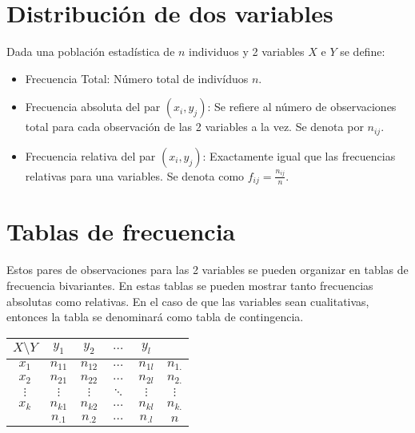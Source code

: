 \documentclass[10pt,a4paper]{book}
\begin{document}
\section{Distribución de dos variables}
Dada una población estadística de $n$ individuos y 2 variables $X$ e $Y$ se define:
\begin{itemize}
	\item Frecuencia Total: Número total de indivíduos $n$.
	\item Frecuencia absoluta del par $(x_i, y_j)$: Se refiere al número de observaciones total para cada observación de las 2 variables a la vez. Se denota por $n_{ij}$.
	\item Frecuencia relativa del par $(x_i, y_j)$: Exactamente igual que las frecuencias relativas para una variables. Se denota como $f_{ij} = \frac{n_{ij}}{n}$.
\end{itemize}

\section{Tablas de frecuencia}
\begin{minipage}[h]{0.5\textwidth}
\setlength{\parindent}{1.5em} \indent Estos pares de observaciones para las 2 variables se pueden organizar en tablas de frecuencia bivariantes.
En estas tablas se pueden mostrar tanto frecuencias absolutas como relativas. En el caso de que las variables sean cualitativas, entonces la tabla se denominará como tabla de contingencia.
\end{minipage}
\begin{minipage}[h]{0.4\textwidth}
\begin{center}
\begin{tabular}{c||c|c|c|c||c}
	$X\setminus Y$ & $y_1$ & $y_2$ & $\hdots$ & $y_l$ & \\
	\hline \hline
	$x_1$ & $n_{11}$ & $n_{12}$ & $\hdots$ & $n_{1l}$ & $n_{1.}$ \\
	\hline
	$x_2$ & $n_{21}$ & $n_{22}$ & $\hdots$ & $n_{2l}$ & $n_{2.}$ \\
	\hline
	$\vdots$ & $\vdots$ & $\vdots$ & $\ddots$ & $\vdots$ & $\vdots$ \\
	\hline
	$x_k$ & $n_{k1}$ & $n_{k2}$ & $\hdots$ & $n_{kl}$ & $n_{k.}$ \\
	\hline\hline
	 	& $n_{.1}$ & $n_{.2}$ & $\hdots$ & $n_{.l}$ & $n$ \\
\end{tabular}
\end{center}
\end{minipage}
\end{document}
